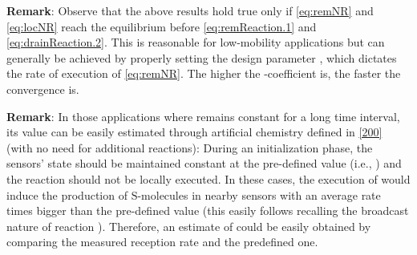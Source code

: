 \documentclass[journal]{IEEEtran}
\newcommand{\mol}[1]{\ensuremath{\textrm{#1}}}
\begin{document}
{{\bf{Remark}}: Observe that the above results hold true only if \eqref{eq:remNR} and \eqref{eq:locNR} reach the equilibrium before \eqref{eq:remReaction.1} and \eqref{eq:drainReaction.2}. This is reasonable for low-mobility applications but can generally be achieved by properly setting the design parameter , which dictates the rate of execution of \eqref{eq:remNR}. The higher the -coefficient is, the faster the convergence is.} 

{{\bf{Remark}}: In those applications where  remains constant for a long time interval, its value can be easily estimated through artificial chemistry  defined in \eqref{200} (with no need for additional reactions): During an initialization phase, the sensors' state should be maintained constant at the pre-defined value  (i.e., ) and the reaction  should not be locally executed. {In these cases}, the execution of  would induce the production of \mol{S}-molecules in nearby sensors with an average rate  times bigger than the pre-defined value  (this easily follows recalling the broadcast nature of reaction ). Therefore, an estimate of  could be easily obtained by comparing the measured reception rate and the predefined one.} 
\end{document}

